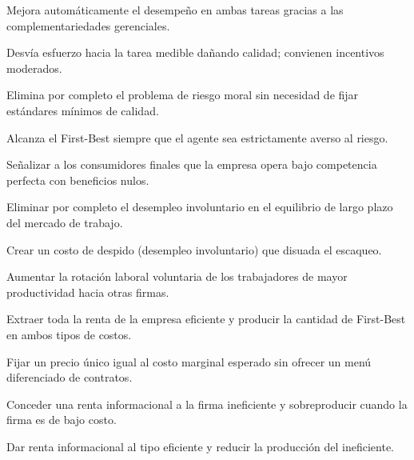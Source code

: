 \begin{opts}
    \item Mejora automáticamente el desempeño en ambas tareas gracias a las complementariedades gerenciales.
    \item Desvía esfuerzo hacia la tarea medible dañando calidad; convienen incentivos moderados.
    \item Elimina por completo el problema de riesgo moral sin necesidad de fijar estándares mínimos de calidad.
    \item Alcanza el First-Best siempre que el agente sea estrictamente averso al riesgo.
\end{opts}

\begin{opts}
    \item Señalizar a los consumidores finales que la empresa opera bajo competencia perfecta con beneficios nulos.
    \item Eliminar por completo el desempleo involuntario en el equilibrio de largo plazo del mercado de trabajo.
    \item Crear un costo de despido (desempleo involuntario) que disuada el escaqueo.
    \item Aumentar la rotación laboral voluntaria de los trabajadores de mayor productividad hacia otras firmas.
\end{opts}

\begin{opts}
    \item Extraer toda la renta de la empresa eficiente y producir la cantidad de First-Best en ambos tipos de costos.
    \item Fijar un precio único igual al costo marginal esperado sin ofrecer un menú diferenciado de contratos.
    \item Conceder una renta informacional a la firma ineficiente y sobreproducir cuando la firma es de bajo costo.
    \item Dar renta informacional al tipo eficiente y reducir la producción del ineficiente.
\end{opts}

